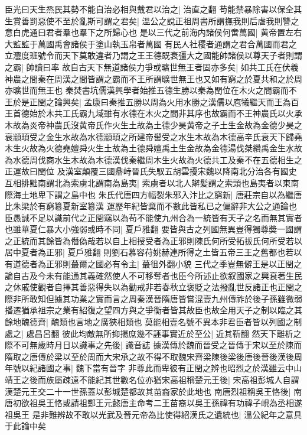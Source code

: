 臣光曰天生烝民其勢不能自治必相與戴君以治之|{
	治直之翻}
苟能禁暴除害以保全其生賞善罰惡使不至於亂斯可謂之君矣|{
	溫公之說正祖周書所謂撫我則后虐我則讐之意白虎通曰君者羣也羣下之所歸心也}
是以三代之前海内諸侯何啻萬國|{
	黄帝置左右大監監于萬國禹會諸侯于塗山執玉帛者萬國}
有民人社稷者通謂之君合萬國而君之立灋度班號令而天下莫敢違者乃謂之王王德既衰彊大之國能帥諸侯以尊天子者則謂之霸|{
	帥讀曰率}
故自古天下無道諸侯力爭或曠世無王者固亦多矣|{
	如共工氏在伏羲神農之間秦在周漢之間皆謂之霸而不王所謂曠世無王也又如有窮之於夏共和之於周亦曠世而無王也}
秦焚書坑儒漢興學者始推五德生勝以秦為閏位在木火之間霸而不王於是正閏之論興矣|{
	孟康曰秦推五勝以周為火用水勝之漢儒以庖犧繼天而王為百王首德始於木共工氏霸九域雖有水德在木火之間非其序也故霸而不王神農氏以火承木故為炎帝神農氏沒黄帝氏作火生土故為土德少昊黄帝之子土生金故為金德少昊之衰顓頊受之金生水故為水德顓頊之所建帝嚳受之水生木故為木德高辛氏衰天下歸堯木生火故為火德堯嬗舜火生土故為土德舜嬗禹土生金故為金德湯伐桀纘禹金生水故為水德周伐商水生木故為木德漢伐秦繼周木生火故為火德共工及秦不在五德相生之正運故曰閏位}
及漢室顛覆三國鼎峙晉氏失馭五胡雲擾宋魏以降南北分治各有國史互相排黜南謂北為索虜北謂南為島夷|{
	索虜者以北人辮髪謂之索頭也島夷者以東南際海土地卑下謂之島中也}
朱氏代唐四方幅裂朱邪入汴比之窮新|{
	唐莊宗自以為繼唐比朱梁於有窮簒夏新室簒漢}
運歷年紀皆棄而不數此皆私已之偏辭非大公之通論也臣愚誠不足以識前代之正閏竊以為苟不能使九州合為一統皆有天子之名而無其實者也雖華夏仁暴大小強弱或時不同|{
	夏戶雅翻}
要皆與古之列國無異豈得獨尊奬一國謂之正統而其餘皆為僭偽哉若以自上相授受者為正邪則陳氏何所受拓拔氏何所受若以居中夏者為正邪|{
	夏戶雅翻}
則劉石慕容苻姚赫連所得之土皆五帝三王之舊都也若以有道德者為正邪則蕞爾之國必有令主|{
	蕞徂外翻小貌}
三代之季豈無僻王是以正閏之論自古及今未有能通其義確然使人不可移奪者也臣今所述止欲叙國家之興衰著生民之休戚使觀者自擇其善惡得失以為勸戒非若春秋立褒貶之法撥亂世反諸正也正閏之際非所敢知但據其功業之實而言之周秦漢晉隋唐皆嘗混壹九州傳祚於後子孫雖微弱播遷猶承祖宗之業有紹復之望四方與之爭衡者皆其故臣也故全用天子之制以臨之其餘地醜德齊|{
	醜類也言地之廣狹相類也}
莫能相壹名號不異本非君臣者皆以列國之制處之|{
	處昌呂翻}
彼此均敵無所抑揚庶幾不誣事實近於至公|{
	近其靳翻}
然天下離析之際不可無歲時月日以識事之先後|{
	識音誌}
據漢傳於魏而晉受之晉傳于宋以至於陳而隋取之唐傳於梁以至於周而大宋承之故不得不取魏宋齊梁陳後梁後唐後晉後漢後周年號以紀諸國之事|{
	魏下當有晉字}
非尊此而卑彼有正閏之辨也昭烈之於漢雖云中山靖王之後而族屬疎遠不能紀其世數名位亦猶宋高祖稱楚元王後|{
	宋高祖彭城人自謂漢楚元王交二十一世孫蓋以彭城楚都故其苗裔家於此地也}
南唐烈祖稱吳王恪後|{
	南唐初欲祖吳王恪或請祖鄭王元懿唐主命考二王苗裔以吳王孫禕有功禕子峴為丞相遂祖吳王}
是非難辨故不敢以光武及晉元帝為比使得紹漢氏之遺統也|{
	溫公紀年之意具于此論中矣}


